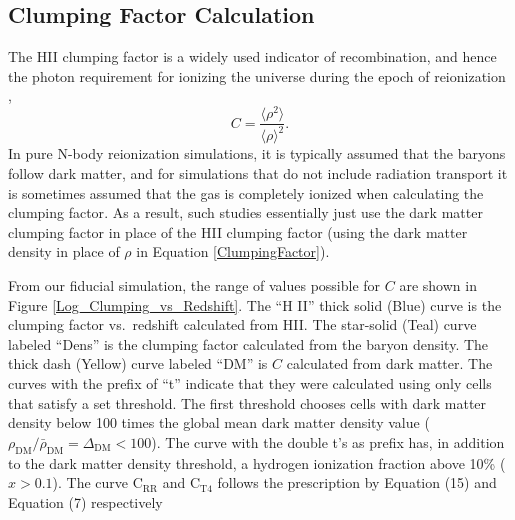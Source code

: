 \documentclass[letterpaper,10pt]{article}
\renewcommand{\(}{\left(}
\renewcommand{\)}{\right)}
\begin{document}

\subsection{Clumping Factor Calculation}
\label{ClumpingFactorCalculation}
The H{\footnotesize II} clumping factor is a widely used indicator of
recombination, and hence the photon requirement for ionizing the
universe during the epoch of reionization \citep{ValageasSilk1999, FanCarilliKeating2006}, 
\begin{equation}
\label{ClumpingFactor}
C = \frac{\langle \rho^2 \rangle}{\langle \rho \rangle^2}.
\end{equation}
In pure N-body reionization simulations, it is typically assumed that
the baryons follow dark matter, and for simulations that do not
include radiation transport it is sometimes assumed that the gas is
completely ionized when calculating the clumping
factor\citep{LoebBarkana2001, Finlator2011}.  As a result, such
studies essentially just use the dark matter clumping factor in
place of the H{\footnotesize II} clumping factor (using the dark
matter density in place of $\rho$ in Equation \ref{ClumpingFactor}). 

From our fiducial simulation, the range of values possible for $C$ are
shown in Figure \ref{Log_Clumping_vs_Redshift}.  The ``H{\footnotesize
II}'' thick solid (Blue) curve is the clumping factor vs.~redshift calculated
from H{\footnotesize II}.  The star-solid (Teal) curve labeled ``Dens''
is the clumping factor calculated from the baryon density.  The thick
dash (Yellow) curve labeled ``DM'' is $C$ calculated from dark matter. The
curves with the prefix of ``t'' indicate that they were calculated
using only cells that satisfy a set threshold.  The first threshold
chooses cells with dark matter density below 100 times the global mean
dark matter density value 
($\rho_\mathrm{DM}/\bar{\rho}_\mathrm{DM}=\Delta_\mathrm{DM}<100$). 
The curve with the double t's as prefix has, in
addition to the dark matter density threshold, a hydrogen ionization
fraction above 10\% ($x > 0.1$).  The curve C$_\mathrm{RR}$ and C$_\mathrm{T4}$ follows the 
prescription by \citet{ShullEtAl2012} Equation (15) and \citet{FinlatorEtAl2012} Equation (7) respectively
\end{document}

